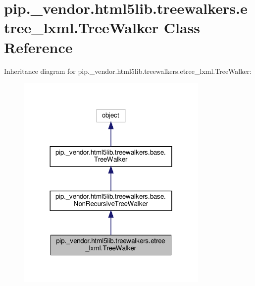 \hypertarget{classpip_1_1__vendor_1_1html5lib_1_1treewalkers_1_1etree__lxml_1_1TreeWalker}{}\section{pip.\+\_\+vendor.\+html5lib.\+treewalkers.\+etree\+\_\+lxml.\+Tree\+Walker Class Reference}
\label{classpip_1_1__vendor_1_1html5lib_1_1treewalkers_1_1etree__lxml_1_1TreeWalker}


Inheritance diagram for pip.\+\_\+vendor.\+html5lib.\+treewalkers.\+etree\+\_\+lxml.\+Tree\+Walker\+:
\nopagebreak
\begin{figure}[H]
\begin{center}
\leavevmode
\includegraphics[width=264pt]{classpip_1_1__vendor_1_1html5lib_1_1treewalkers_1_1etree__lxml_1_1TreeWalker__inherit__graph}
\end{center}
\end{figure}


